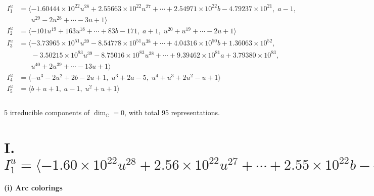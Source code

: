 \documentclass[1p]{elsarticle_modified}
\theoremstyle{definition}
\begin{document}
\begin{align*}
I^u_{1}&=\langle 
-1.60444\times10^{22} u^{28}+2.55663\times10^{22} u^{27}+\cdots+2.54971\times10^{22} b-4.79237\times10^{21},\;a-1,\\
\phantom{I^u_{1}}&\phantom{= \langle  }u^{29}-2 u^{28}+\cdots-3 u+1\rangle \\
I^u_{2}&=\langle 
-101 u^{19}+163 u^{18}+\cdots+83 b-171,\;a+1,\;u^{20}+u^{19}+\cdots-2 u+1\rangle \\
I^u_{3}&=\langle 
-3.73965\times10^{51} u^{39}-8.54778\times10^{51} u^{38}+\cdots+4.04316\times10^{50} b+1.36063\times10^{52},\\
\phantom{I^u_{3}}&\phantom{= \langle  }-3.50215\times10^{83} u^{39}-8.75016\times10^{83} u^{38}+\cdots+9.39462\times10^{81} a+3.79380\times10^{83},\\
\phantom{I^u_{3}}&\phantom{= \langle  }u^{40}+2 u^{39}+\cdots-13 u+1\rangle \\
I^u_{4}&=\langle 
- u^3-2 u^2+2 b-2 u+1,\;u^3+2 a-5,\;u^4+u^3+2 u^2- u+1\rangle \\
I^u_{5}&=\langle 
b+u+1,\;a-1,\;u^2+u+1\rangle \\
\\
\end{align*}
\raggedright * 5 irreducible components of $\dim_{\mathbb{C}}=0$, with total 95 representations.\\
\newpage
\renewcommand{\arraystretch}{1}
\centering \section*{I. $I^u_{1}= \langle -1.60\times10^{22} u^{28}+2.56\times10^{22} u^{27}+\cdots+2.55\times10^{22} b-4.79\times10^{21},\;a-1,\;u^{29}-2 u^{28}+\cdots-3 u+1 \rangle$}
\flushleft \textbf{(i) Arc colorings}\\
\end{document}
